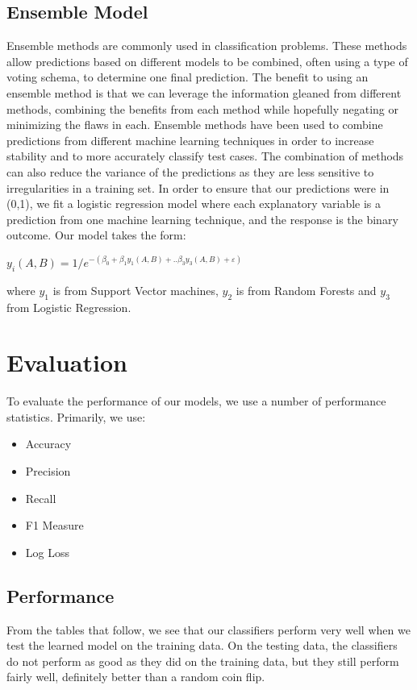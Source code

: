 \documentclass{article}
\begin{document}
\begin{multicols}{2}
	 \subsection{Ensemble Model}
	 Ensemble methods are commonly used in classification problems. These methods allow predictions based on different models to be combined, often using a type of voting schema, to determine one final prediction. The benefit to using an ensemble method is that we can
leverage the information gleaned from different methods, combining the benefits from each method while hopefully negating or minimizing the flaws in each. Ensemble methods have been used to combine predictions from different machine learning techniques in order to increase stability and to more accurately classify test cases. The combination of methods can also reduce the variance of the predictions as they are less sensitive to irregularities in a training set.\cite{4}
	In order to ensure that our predictions were in (0,1), we fit a logistic regression model where each explanatory variable is a prediction from one machine learning technique, and the response is the binary outcome.
Our model takes the form:
\begin{center}
$y_i(A,B) = 1/e^{-(\beta_0 + \beta_1y_1(A,B) +..\beta_3y_3(A,B) + \varepsilon )}$
\end{center}
where $y_1$ is from Support Vector machines, $y_2$ is from Random Forests and $y_3$ from Logistic Regression.
	
	\section{Evaluation}
	To evaluate the performance of our models, we use a number of performance statistics. Primarily, we use:
	
	\begin{center}		
	\end{center}
	
	\begin{itemize}
	\item Accuracy
	\item Precision
	\item Recall
	\item F1 Measure
	\item Log Loss
	\end{itemize}
	
	\subsection{Performance}
	From the tables that follow, we see that our classifiers perform very well when we test the learned model on the training data. On the testing data, the classifiers do not perform as good as they did on the training data, but they still perform fairly well, definitely better than a random coin flip.
	

\end{multicols}
\end{document}

